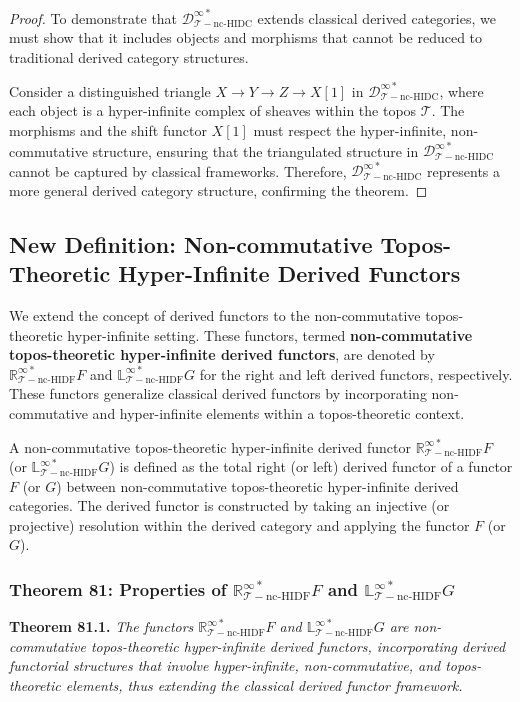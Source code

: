 \documentclass{article}
\begin{document}
\begin{proof}
To demonstrate that \(\mathcal{D}_{\mathcal{T}-\text{nc-HIDC}}^{\infty *}\) extends classical derived categories, we must show that it includes objects and morphisms that cannot be reduced to traditional derived category structures.

Consider a distinguished triangle \(X \to Y \to Z \to X[1]\) in \(\mathcal{D}_{\mathcal{T}-\text{nc-HIDC}}^{\infty *}\), where each object is a hyper-infinite complex of sheaves within the topos \(\mathcal{T}\). The morphisms and the shift functor \(X[1]\) must respect the hyper-infinite, non-commutative structure, ensuring that the triangulated structure in \(\mathcal{D}_{\mathcal{T}-\text{nc-HIDC}}^{\infty *}\) cannot be captured by classical frameworks. Therefore, \(\mathcal{D}_{\mathcal{T}-\text{nc-HIDC}}^{\infty *}\) represents a more general derived category structure, confirming the theorem.
\end{proof}

\subsection{New Definition: Non-commutative Topos-Theoretic Hyper-Infinite Derived Functors}
We extend the concept of derived functors to the non-commutative topos-theoretic hyper-infinite setting. These functors, termed \textbf{non-commutative topos-theoretic hyper-infinite derived functors}, are denoted by \(\mathbb{R}_{\mathcal{T}-\text{nc-HIDF}}^{\infty *}F\) and \(\mathbb{L}_{\mathcal{T}-\text{nc-HIDF}}^{\infty *}G\) for the right and left derived functors, respectively. These functors generalize classical derived functors by incorporating non-commutative and hyper-infinite elements within a topos-theoretic context.

A non-commutative topos-theoretic hyper-infinite derived functor \(\mathbb{R}_{\mathcal{T}-\text{nc-HIDF}}^{\infty *}F\) (or \(\mathbb{L}_{\mathcal{T}-\text{nc-HIDF}}^{\infty *}G\)) is defined as the total right (or left) derived functor of a functor \(F\) (or \(G\)) between non-commutative topos-theoretic hyper-infinite derived categories. The derived functor is constructed by taking an injective (or projective) resolution within the derived category and applying the functor \(F\) (or \(G\)).

\subsubsection{Theorem 81: Properties of \(\mathbb{R}_{\mathcal{T}-\text{nc-HIDF}}^{\infty *}F\) and \(\mathbb{L}_{\mathcal{T}-\text{nc-HIDF}}^{\infty *}G\)}
\textbf{Theorem 81.1.} \textit{The functors \(\mathbb{R}_{\mathcal{T}-\text{nc-HIDF}}^{\infty *}F\) and \(\mathbb{L}_{\mathcal{T}-\text{nc-HIDF}}^{\infty *}G\) are non-commutative topos-theoretic hyper-infinite derived functors, incorporating derived functorial structures that involve hyper-infinite, non-commutative, and topos-theoretic elements, thus extending the classical derived functor framework.}
\end{document}
